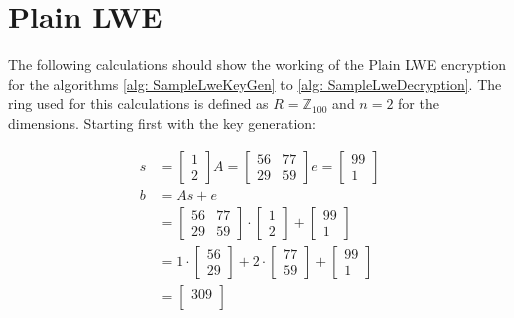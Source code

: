 \section{Plain LWE}
\label{app:PlainLweCalc}
The following calculations should show the working of the Plain LWE encryption for the algorithms \ref{alg: SampleLweKeyGen} to \ref{alg: SampleLweDecryption}. The ring used for this calculations is defined as $R=\mathbb{Z}_{100}$ and $n=2$ for the dimensions. Starting first with the key generation:


\begin{align*}
  s  & = \begin{bmatrix}1 \\ 2 \end{bmatrix}
  A  = \begin{bmatrix}56 & 77 \\ 29 & 59 \end{bmatrix}
  e  = \begin{bmatrix}99 \\ 1 \end{bmatrix}       \\
  b  & = As+e                                     \\
     & = \begin{bmatrix}
           56 & 77 \\
           29 & 59
         \end{bmatrix}
  \cdot
  \begin{bmatrix}
    1 \\
    2
  \end{bmatrix}
  +
  \begin{bmatrix}
    99 \\ 
    1 
  \end{bmatrix}
  \\
     & = 1
  \cdot
  \begin{bmatrix}
    56 \\
    29
  \end{bmatrix}
  + 2 
  \cdot
  \begin{bmatrix}
    77 \\ 
    59 
  \end{bmatrix}
  + 
  \begin{bmatrix}
    99 \\ 
    1 
  \end{bmatrix}                                  \\
     & = \begin{bmatrix}
           309 \\

\end{bmatrix}
\end{align*}
